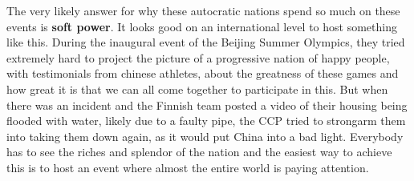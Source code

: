 \documentclass{article}
\begin{document}
	The very likely answer for why these autocratic nations spend so much on these events is \textbf{soft power}. It looks good on an international level to host something like this. During the inaugural event of the Beijing Summer Olympics, they tried extremely hard to project the picture of a progressive nation of happy people, with testimonials from chinese athletes, about the greatness of these games and how great it is that we can all come together to participate in this. But when there was an incident and the Finnish team posted a video of their housing being flooded with water, likely due to a faulty pipe, the CCP tried to strongarm them into taking them down again, as it would put China into a bad light. Everybody has to see the riches and splendor of the nation and the easiest way to achieve this is to host an event where almost the entire world is paying attention.
	
	 


	
	
	
























	
\end{document}
